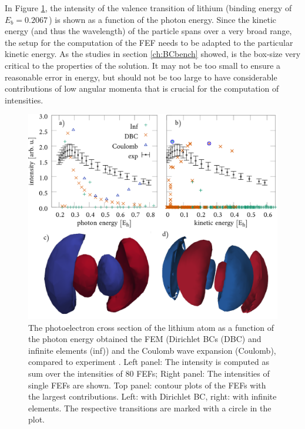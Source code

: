 In Figure \ref{fig:Li-CS}, the intensity of the valence transition of lithium (binding energy of $E_b=0.2067\,$) is shown as a function of the photon energy.
Since the kinetic energy (and thus the wavelength) of the particle spans over a very broad range, the setup for the computation of the FEF needs to be adapted to the particular kinetic energy.
As the studies in section \ref{ch:BCbench} showed, is the box-size very critical to the properties of the solution.
It may not be too small to ensure a reasonable error in energy, but should not be too large to have considerable contributions of low angular momenta that is crucial for the computation of intensities.
\begin{figure}
\includegraphics[width=\textwidth]{Figures/Lithium/CrossSect2}
\caption{The photoelectron cross section of the lithium atom as a function of the photon energy obtained the FEM (Dirichlet BCs (DBC) and infinite elements (inf)) and the Coulomb wave expansion (Coulomb), compared to experiment \cite{LiCS}.
Left panel: The intensity is computed as sum over the intensities of $80$ FEFs;
Right panel: The intensities of single FEFs are shown.
Top panel: contour plots of the FEFs with the largest contributions. Left: with Dirichlet BC, right: with infinite elements. The respective transitions are marked with a circle in the plot.
}
\label{fig:Li-CS}
\end{figure}
